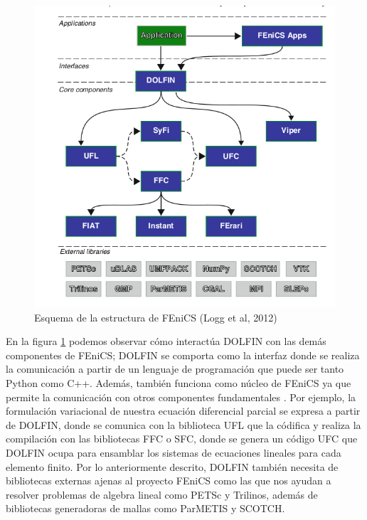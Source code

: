 \begin{figure}[ht!]
\centering
\includegraphics[scale=0.55]{Figura14.png}
\caption{ Esquema de la estructura de FEniCS (Logg et al, 2012) }
\label{Figura14:2}
\end{figure}

En la figura \ref{Figura14:2} podemos observar cómo interactúa DOLFIN con las demás componentes de FEniCS; DOLFIN se comporta como la interfaz donde se realiza la comunicación a partir de un lenguaje de programación que puede ser tanto Python como C++. Además, también funciona como núcleo de FEniCS ya que permite la comunicación con otros componentes fundamentales . Por ejemplo, la formulación variacional de nuestra ecuación diferencial parcial se expresa a partir de DOLFIN, donde se comunica con la biblioteca UFL que la códifica y realiza la compilación con las bibliotecas FFC o SFC, donde se genera un código UFC que DOLFIN ocupa para ensamblar los sistemas de ecuaciones lineales para cada elemento finito. Por lo anteriormente descrito, DOLFIN también necesita de bibliotecas externas ajenas al proyecto FEniCS como las que nos ayudan a resolver problemas de algebra lineal como PETSc y Trilinos, además de bibliotecas generadoras de mallas como ParMETIS y SCOTCH.

